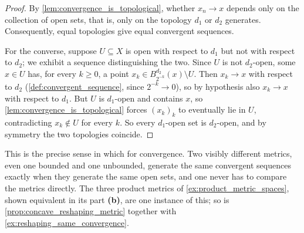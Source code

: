\begin{proof}
By \cref{lem:convergence_is_topological}, whether $x_n \to x$ depends only on the collection of
open sets, that is, only on the topology $d_1$ or $d_2$ generates. Consequently, equal topologies
give equal convergent sequences.

For the converse, suppose $U \subseteq X$ is open with respect to $d_1$ but not with respect to
$d_2$; we exhibit a sequence distinguishing the two. Since $U$ is not $d_2$-open, some $x \in U$
has, for every $k \geq 0$, a point $x_k \in B^{d_2}_{2^{-k}}(x) \setminus U$. Then $x_k \to x$
with respect to $d_2$ (\cref{def:convergent_sequence}, since $2^{-k}\to0$), so by hypothesis also
$x_k \to x$ with respect to $d_1$. But $U$ is $d_1$-open and contains $x$, so
\cref{lem:convergence_is_topological} forces $(x_k)_k$ to eventually lie in $U$, contradicting
$x_k \notin U$ for every $k$. So every $d_1$-open set is $d_2$-open, and by symmetry the two
topologies coincide.
\end{proof}

\begin{remark}
This is the precise sense in which  for
convergence. Two visibly different metrics, even one bounded and one unbounded, generate the same
convergent sequences exactly when they generate the same open sets, and one never has to compare
the metrics directly. The three product metrics of \cref{ex:product_metric_spaces}, shown
equivalent in its part \textbf{(b)}, are one instance of this; so is
\cref{prop:concave_reshaping_metric} together with \cref{ex:reshaping_same_convergence}.
\end{remark}

